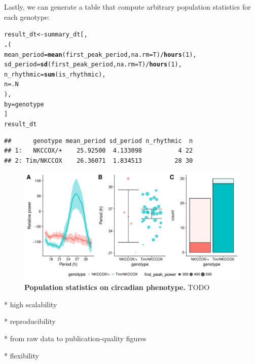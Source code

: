 \documentclass[10pt,letterpaper]{article}\usepackage[]{graphicx}\usepackage[]{color}
\makeatletter
\newcommand{\hlnum}[1]{\textcolor[rgb]{0.686,0.059,0.569}{#1}}%
\newcommand{\hlopt}[1]{\textcolor[rgb]{0,0,0}{#1}}%
\newcommand{\hlstd}[1]{\textcolor[rgb]{0.345,0.345,0.345}{#1}}%
\newcommand{\hlkwb}[1]{\textcolor[rgb]{0.69,0.353,0.396}{#1}}%
\newcommand{\hlkwc}[1]{\textcolor[rgb]{0.333,0.667,0.333}{#1}}%
\newcommand{\hlkwd}[1]{\textcolor[rgb]{0.737,0.353,0.396}{\textbf{#1}}}%
\newenvironment{kframe}{%
 \def\at@end@of@kframe{}%
 \ifinner\ifhmode%
  \def\at@end@of@kframe{\end{minipage}}%
  \begin{minipage}{\columnwidth}%
 \fi\fi%
 \def\FrameCommand##1{\hskip\@totalleftmargin \hskip-\fboxsep
 \colorbox{shadecolor}{##1}\hskip-\fboxsep
     \hskip-\linewidth \hskip-\@totalleftmargin \hskip\columnwidth}%
 \MakeFramed {\advance\hsize-\width
   \@totalleftmargin\z@ \linewidth\hsize
   \@setminipage}}%
 {\par\unskip\endMakeFramed%
 \at@end@of@kframe}
\newenvironment{knitrout}{}{} %
\makeatother
\begin{document}
Lastly, we can generate a table that compute arbitrary population statistics for each genotype:
\begin{knitrout}
\color{fgcolor}\begin{kframe}
\begin{alltt}
\hlstd{result_dt} \hlkwb{<-} \hlstd{summary_dt[,}
          \hlkwd{.}\hlstd{(}
            \hlkwc{mean_period} \hlstd{=} \hlkwd{mean}\hlstd{(first_peak_period,} \hlkwc{na.rm} \hlstd{= T)} \hlopt{/} \hlkwd{hours}\hlstd{(}\hlnum{1}\hlstd{),}
            \hlkwc{sd_period} \hlstd{=} \hlkwd{sd}\hlstd{(first_peak_period,} \hlkwc{na.rm} \hlstd{= T)} \hlopt{/} \hlkwd{hours}\hlstd{(}\hlnum{1}\hlstd{),}
            \hlkwc{n_rhythmic} \hlstd{=} \hlkwd{sum}\hlstd{(is_rhythmic),}
            \hlkwc{n} \hlstd{= .N}
            \hlstd{),}
          \hlkwc{by} \hlstd{= genotype}
          \hlstd{]}
\hlstd{result_dt}
\end{alltt}
\begin{verbatim}
##      genotype mean_period sd_period n_rhythmic  n
## 1:   NKCCOX/+    25.92500  4.133098          4 22
## 2: Tim/NKCCOX    26.36071  1.834513         28 30
\end{verbatim}
\end{kframe}
\end{knitrout}


\begin{figure}[!h]
	\includegraphics[width=1\textwidth]{fig/fig-4.pdf}
	\caption{{\bf Population statistics on circadian phenotype.}
			TODO}
	\label{fig:fig-4}
\end{figure}


* high scalability

* reproducibility

* from raw data to publication-quality figures

* flexibility
\end{document}
